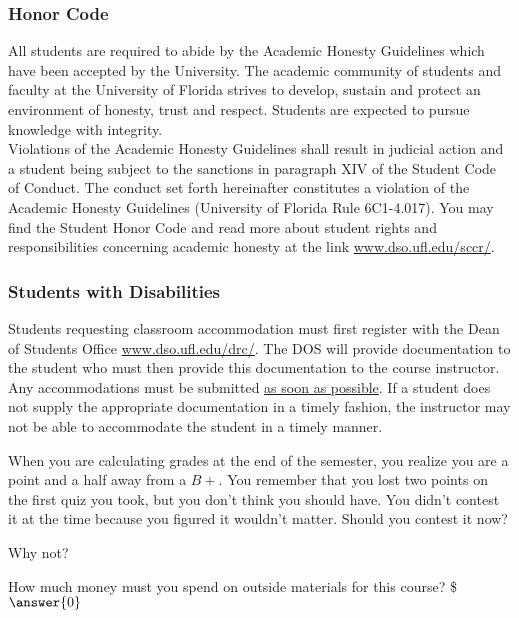 \documentclass{ximera}
\begin{document}
\subsubsection*{Honor Code}
    All students are required to abide by the Academic Honesty Guidelines which have been accepted by the University. The academic community of students and faculty at the University of Florida strives to develop, sustain and protect an environment of honesty, trust and respect. Students are expected to pursue knowledge with integrity.\\

    \noindent Violations of the Academic Honesty Guidelines shall result in judicial action and a student being subject to the sanctions in paragraph XIV of the Student Code of Conduct. The conduct set forth hereinafter constitutes a violation of the Academic Honesty Guidelines (University of Florida Rule 6C1-4.017).  You may find the Student Honor Code and read more about student rights and responsibilities concerning academic honesty at the link \url{www.dso.ufl.edu/sccr/}.

\subsubsection*{Students with Disabilities}
    Students requesting classroom accommodation must first register with the Dean of Students Office \url{www.dso.ufl.edu/drc/}. The DOS will provide documentation to the student who must then provide this documentation to the course instructor. Any accommodations must be submitted \underline{as soon as possible}.  If a student does not supply the appropriate documentation in a timely fashion, the instructor may not be able to accommodate the student in a timely manner.     
    

\begin{question}
    When you are calculating grades at the end of the semester, you realize you are a point and a half away from a $B+$. You remember that you lost two points on the first quiz you took, but you don't think you should have. You didn't contest it at the time because you figured it wouldn't matter. Should you contest it now?
    
    \begin{multipleChoice}
    \end{multipleChoice}
    \begin{question}
        Why not?
        \begin{multipleChoice}
        \end{multipleChoice}
    \end{question}
\end{question}

\begin{question}
    How much money must you spend on outside materials for this course? \$$\answer{0}$
\end{question}
\end{document}
